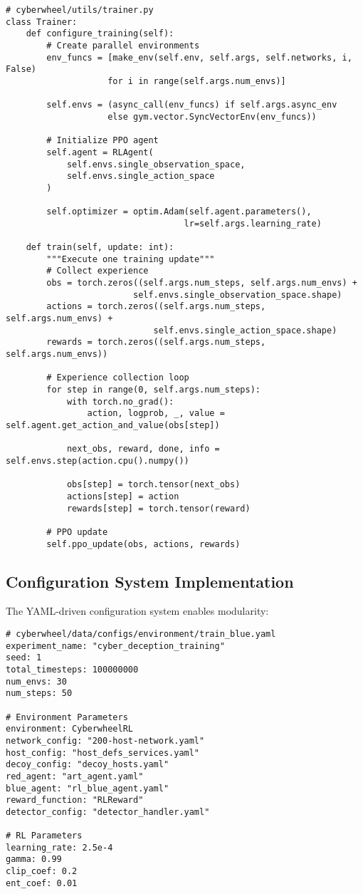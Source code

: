 \documentclass[12pt,a4paper]{article}
\begin{document}
\begin{lstlisting}[caption=Training Implementation]
# cyberwheel/utils/trainer.py
class Trainer:
    def configure_training(self):
        # Create parallel environments
        env_funcs = [make_env(self.env, self.args, self.networks, i, False) 
                    for i in range(self.args.num_envs)]
        
        self.envs = (async_call(env_funcs) if self.args.async_env 
                    else gym.vector.SyncVectorEnv(env_funcs))
        
        # Initialize PPO agent
        self.agent = RLAgent(
            self.envs.single_observation_space,
            self.envs.single_action_space
        )
        
        self.optimizer = optim.Adam(self.agent.parameters(), 
                                   lr=self.args.learning_rate)
    
    def train(self, update: int):
        """Execute one training update"""
        # Collect experience
        obs = torch.zeros((self.args.num_steps, self.args.num_envs) + 
                         self.envs.single_observation_space.shape)
        actions = torch.zeros((self.args.num_steps, self.args.num_envs) + 
                             self.envs.single_action_space.shape)
        rewards = torch.zeros((self.args.num_steps, self.args.num_envs))
        
        # Experience collection loop
        for step in range(0, self.args.num_steps):
            with torch.no_grad():
                action, logprob, _, value = self.agent.get_action_and_value(obs[step])
            
            next_obs, reward, done, info = self.envs.step(action.cpu().numpy())
            
            obs[step] = torch.tensor(next_obs)
            actions[step] = action
            rewards[step] = torch.tensor(reward)
        
        # PPO update
        self.ppo_update(obs, actions, rewards)
\end{lstlisting}

\subsection{Configuration System Implementation}
The YAML-driven configuration system enables modularity:

\begin{lstlisting}[caption=Environment Configuration Example]
# cyberwheel/data/configs/environment/train_blue.yaml
experiment_name: "cyber_deception_training"
seed: 1
total_timesteps: 100000000
num_envs: 30
num_steps: 50

# Environment Parameters
environment: CyberwheelRL
network_config: "200-host-network.yaml"
host_config: "host_defs_services.yaml"
decoy_config: "decoy_hosts.yaml"
red_agent: "art_agent.yaml"
blue_agent: "rl_blue_agent.yaml"
reward_function: "RLReward"
detector_config: "detector_handler.yaml"

# RL Parameters
learning_rate: 2.5e-4
gamma: 0.99
clip_coef: 0.2
ent_coef: 0.01
\end{lstlisting}
\end{document}
